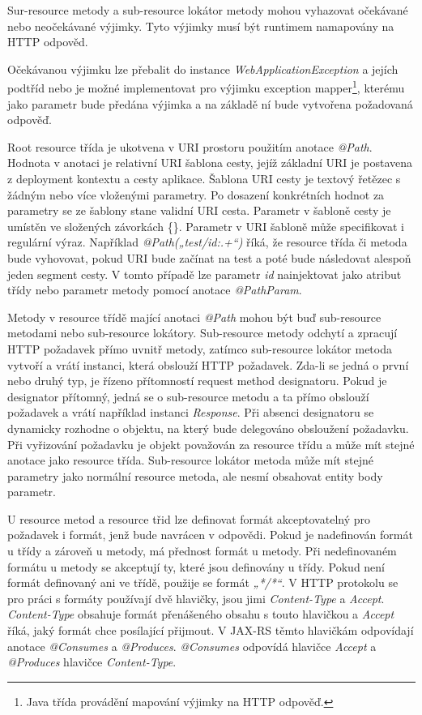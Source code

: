 \documentclass[11pt,twoside,a4paper]{book}
\begin{document}
Sur-resource metody a sub-resource lokátor metody mohou vyhazovat očekávané nebo
neočekávané výjimky. Tyto výjimky musí být runtimem namapovány na HTTP odpověd.

Očekávanou výjimku lze přebalit do instance {\em WebApplicationException} a
jejích podtříd nebo je možné implementovat pro výjimku exception
mapper\footnote{Java třída provádění mapování výjimky na HTTP odpověď.}, kterému
jako parametr bude předána výjimka a na základě ní bude vytvořena požadovaná odpověď.

Root resource třída je ukotvena v URI prostoru použitím anotace {\em @Path}.
Hodnota v anotaci je relativní URI šablona cesty, jejíž základní URI je postavena z deployment kontextu a cesty
aplikace. Šablona URI cesty je textový řetězec s žádným nebo více vloženými parametry. Po
dosazení konkrétních hodnot za parametry se ze šablony stane validní URI cesta. Parametr v
šabloně cesty je umístěn ve složených závorkách \{\}. Parametr v URI šabloně
může specifikovat i regulární výraz. Například {\em @Path(„test/{id:.+}“)} říká,
že resource třída či metoda bude vyhovovat, pokud URI bude začínat na test a poté bude následovat alespoň jeden
segment cesty. V tomto případě lze parametr {\em id} nainjektovat jako atribut
třídy nebo parametr metody pomocí anotace {\em @PathParam}.

Metody v resource třídě mající anotaci {\em @Path} mohou být buď sub-resource
metodami nebo sub-resource lokátory. Sub-resource metody odchytí a zpracují HTTP požadavek přímo uvnitř
metody, zatímco sub-resource lokátor metoda vytvoří a vrátí instanci, která obslouží HTTP
požadavek. Zda-li se jedná o první nebo druhý typ, je řízeno přítomností request method
designatoru. Pokud je designator přítomný, jedná se o sub-resource metodu a ta přímo
obslouží požadavek a vrátí například instanci {\em Response}. Při absenci designatoru se dynamicky
rozhodne o objektu, na který bude delegováno obsloužení požadavku. Při vyřizování
požadavku je objekt považován za resource třídu a může mít stejné anotace jako resource
třída. Sub-resource lokátor metoda může mít stejné parametry jako normální resource metoda,
ale nesmí obsahovat entity body parametr.

U resource metod a resource třid lze definovat formát akceptovatelný pro
požadavek i formát, jenž bude navrácen v odpovědi. Pokud je nadefinován formát u
třídy a zároveň u metody, má přednost formát u metody. Při nedefinovaném formátu
u metody se akceptují ty, které jsou definovány u třídy. Pokud není formát
definovaný ani ve třídě, použije se formát {\em „*/*“}. V HTTP protokolu se pro
práci s formáty používají dvě hlavičky, jsou jimi {\em Content-Type} a {\em
Accept}.
{\em Content-Type} obsahuje formát přenášeného obsahu s touto hlavičkou a {\em
Accept} říká, jaký formát chce posílající přijmout. V JAX-RS těmto hlavičkám
odpovídají anotace {\em @Consumes} a {\em @Produces}. {\em @Consumes} odpovídá
hlavičce {\em Accept} a {\em @Produces} hlavičce {\em Content-Type}.
\end{document}
